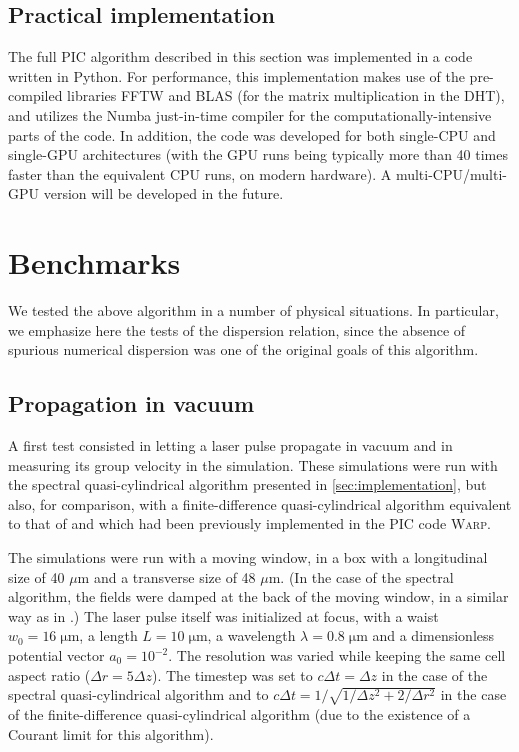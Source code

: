 \documentclass[1p,times,authoryear]{elsarticle}
\begin{document}
\subsection{Practical implementation}

The full PIC algorithm described in this section was implemented in a
code written in Python. For performance, this implementation makes use of the
pre-compiled libraries FFTW and BLAS (for the matrix multiplication
  in the DHT), and utilizes the Numba just-in-time compiler for the
  computationally-intensive parts of the code. In addition, the code
  was developed for both single-CPU and single-GPU architectures (with the GPU runs
  being typically more than 40 times faster than the equivalent CPU runs, on
  modern hardware). A multi-CPU/multi-GPU version will be developed in
  the future.

\section{Benchmarks}
\label{sec:benchmarks}

We tested the above algorithm in a number of physical situations. In
particular, we emphasize here the tests of the dispersion relation, since the absence of
spurious numerical dispersion was one of the original goals of this algorithm.

\subsection{Propagation in vacuum}
\label{sec:vacuum_vg}

A first test consisted in letting a laser pulse propagate in vacuum and in
measuring its group velocity in the simulation. These simulations were
run with the spectral quasi-cylindrical algorithm presented in
\cref{sec:implementation}, but also, for comparison, with a finite-difference quasi-cylindrical
algorithm equivalent to that of \cite{Lifschitz,Davidson} and which had
been previously implemented in the PIC code \textsc{Warp}.

The simulations were run with a moving window, in a box with a
longitudinal size of 40 $\mu$m and a transverse size of 48 $\mu$m. (In
the case of the spectral algorithm, the fields were damped at the back
of the moving window, in a similar way as in \citep{YuIPAC2015}.)
The laser pulse itself was initialized at focus, with a waist 
$w_0 = 16 \;\mathrm{\mu m}$, a length $L = 10 \; \mathrm{\mu m}$,
a wavelength $\lambda = 0.8 \; \mathrm{\mu m}$ and a 
dimensionless potential vector $a_0 = 10^{-2}$.
The resolution was varied while keeping the same cell aspect ratio ($\Delta r = 5\Delta z$). The
timestep was set to $c\Delta t = \Delta z$ in the case of the spectral
quasi-cylindrical algorithm and to $c\Delta t = 1/\sqrt{1/\Delta z^2 +
  2/\Delta r^2}$ in the case of the finite-difference
quasi-cylindrical algorithm (due to the existence of a Courant
limit for this algorithm). 
\end{document}
